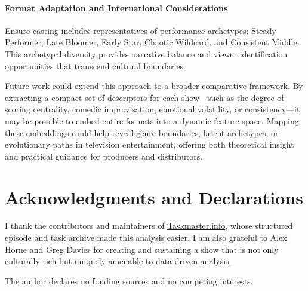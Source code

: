 \documentclass[10pt,letterpaper]{article}
\begin{document}
\paragraph{Format Adaptation and International Considerations}
Ensure casting includes representatives of performance archetypes: Steady Performer, Late Bloomer, Early Star, Chaotic Wildcard, and Consistent Middle. This archetypal diversity provides narrative balance and viewer identification opportunities that transcend cultural boundaries.

Future work could extend this approach to a broader comparative framework. By extracting a compact set of descriptors for each show—such as the degree of scoring centrality, comedic improvisation, emotional volatility, or consistency—it may be possible to embed entire formats into a dynamic feature space. Mapping these embeddings could help reveal genre boundaries, latent archetypes, or evolutionary paths in television entertainment, offering both theoretical insight and practical guidance for producers and distributors.

\section*{Acknowledgments and Declarations}

I thank the contributors and maintainers of \href{https://taskmaster.info}{Taskmaster.info}, whose structured episode and task archive made this analysis easier. I am also grateful to Alex Horne and Greg Davies for creating and sustaining a show that is not only culturally rich but uniquely amenable to data-driven analysis.

The author declares no funding sources and no competing interests.

\nolinenumbers
\end{document}
